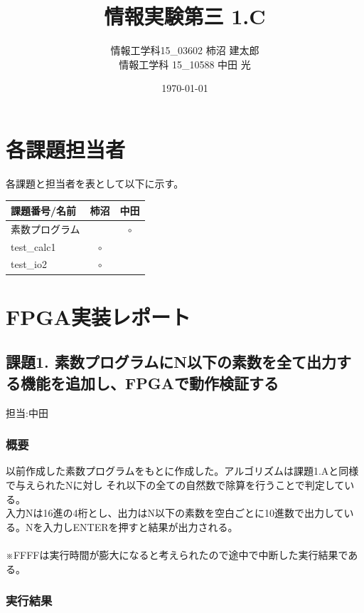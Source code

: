 \documentclass{jsarticle}
\title{情報実験第三 1.C}
\author{情報工学科15\_03602 柿沼 建太郎 \\ 情報工学科 15\_10588 中田 光}
\date{\today}
\begin{document}
\maketitle

\section*{各課題担当者}
各課題と担当者を表として以下に示す。
\begin{table}[h]
\begin{tabular}{|l|c|c|} \hline
課題番号/名前 & 柿沼 & 中田 \\ \hline \hline
素数プログラム &  & $\circ$ \\ \hline
test\_calc1 & $\circ$ & \\ \hline
test\_io2 & $\circ$ & $$ \\ \hline
\end{tabular}
\end{table}

\newpage

\section*{FPGA実装レポート}

\subsection*{課題1. 素数プログラムにN以下の素数を全て出力する機能を追加し、FPGAで動作検証する}
担当:中田\\

\subsubsection*{概要}
以前作成した素数プログラムをもとに作成した。アルゴリズムは課題1.Aと同様で与えられたNに対し
それ以下の全ての自然数で除算を行うことで判定している。\\
入力Nは16進の4桁とし、出力はN以下の素数を空白ごとに10進数で出力している。Nを入力しENTERを押すと結果が出力される。\\
\\
※FFFFは実行時間が膨大になると考えられたので途中で中断した実行結果である。


\subsubsection*{実行結果}
\end{document}
